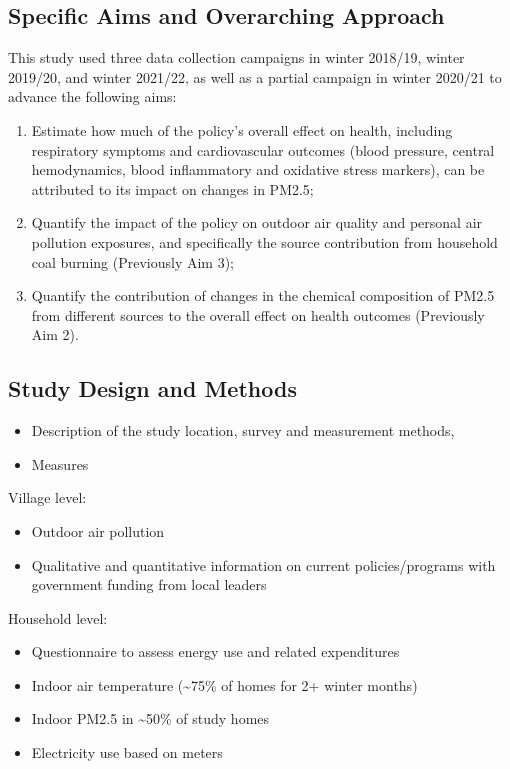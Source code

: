 \documentclass[
  letterpaper,
  DIV=11,
  numbers=noendperiod]{scrartcl}
\providecommand{\tightlist}{%
  \setlength{\itemsep}{0pt}\setlength{\parskip}{0pt}}\usepackage{longtable,booktabs,array}
\begin{document}
\subsection{Specific Aims and Overarching
Approach}\label{specific-aims-and-overarching-approach}

This study used three data collection campaigns in winter 2018/19,
winter 2019/20, and winter 2021/22, as well as a partial campaign in
winter 2020/21 to advance the following aims:

\begin{enumerate}
\def\labelenumi{\arabic{enumi}.}
\item
  Estimate how much of the policy's overall effect on health, including
  respiratory symptoms and cardiovascular outcomes (blood pressure,
  central hemodynamics, blood inflammatory and oxidative stress
  markers), can be attributed to its impact on changes in PM2.5;
\item
  Quantify the impact of the policy on outdoor air quality and personal
  air pollution exposures, and specifically the source contribution from
  household coal burning (Previously Aim 3);
\item
  Quantify the contribution of changes in the chemical composition of
  PM2.5 from different sources to the overall effect on health outcomes
  (Previously Aim 2).
\end{enumerate}

\subsection{Study Design and Methods}\label{study-design-and-methods}

\begin{itemize}
\item
  Description of the study location, survey and measurement methods,
\item
  Measures
\end{itemize}

Village level:

\begin{itemize}
\tightlist
\item
  Outdoor air pollution
\item
  Qualitative and quantitative information on current policies/programs
  with government funding from local leaders
\end{itemize}

Household level:

\begin{itemize}
\tightlist
\item
  Questionnaire to assess energy use and related expenditures
\item
  Indoor air temperature (\textasciitilde75\% of homes for 2+ winter
  months)
\item
  Indoor PM2.5 in \textasciitilde50\% of study homes
\item
  Electricity use based on meters
\end{itemize}
\end{document}
